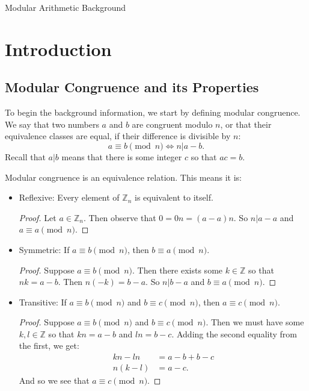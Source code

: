\documentclass{article}
\begin{document}
\huge Modular Arithmetic Background
\normalsize
\section{Introduction}

\subsection{Modular Congruence and its Properties}
To begin the background information, we start by defining modular congruence. We say that two numbers $a$ and $b$ are congruent modulo $n$, or that their equivalence classes are equal, if their difference is divisible by $n$:
\[
a\equiv b\pmod{n}\iff n|a-b
.\] 
Recall that $a|b$ means that there is some integer $c$ so that $ac=b$.

Modular congruence is an equivalence relation. This means it is:
\begin{itemize}

    \item Reflexive: Every element of $\mathbb{Z}_n$ is equivalent to itself.
        \begin{proof} 
            Let $a\in \mathbb{Z}_n$. Then observe that $0=0n=(a-a)n$. So $n|a-a$ and $a\equiv a\pmod{n}$.
        \end{proof}
    \item Symmetric: If $a\equiv b\pmod{n}$, then $b\equiv a \pmod{n}$.
        \begin{proof} 
            Suppose $a\equiv b\pmod{n}$. Then there exists some $k\in \mathbb{Z}$
            so that $nk=a-b$. Then $n(-k)=b-a$. So $n|b-a$ and $b\equiv a\pmod{n}$.
        \end{proof}
    \item Transitive: If $a\equiv b\pmod{n}$ and $b\equiv c\pmod{n}$, then $a\equiv c \pmod{n}$.
        \begin{proof} 
            Suppose $a\equiv b\pmod{n}$ and $b\equiv c\pmod{n}$. Then we must have
            some $k,l\in \mathbb{Z}$ so that $kn=a-b$ and $ln=b-c$. Adding
            the second equality from the first, we get:
            \begin{align*}
                kn- l n&= a-b+b-c \\
                n(k- l) &= a-c 
            .\end{align*}
            And so we see that $a\equiv c\pmod{n}$.
        \end{proof}
\end{itemize}
\end{document}
